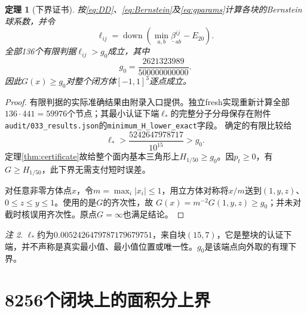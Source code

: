 \documentclass[UTF8,11pt,a4paper,fontset=fandol]{ctexart}
\newtheorem{theorem}{定理}[section]
\theoremstyle{definition}\newtheorem{definition}[theorem]{定义}
\theoremstyle{remark}\newtheorem{remark}[theorem]{注}
\newcommand{\abs}[1]{\left|#1\right|}
\newcommand{\src}[1]{\nolinkurl{#1}}
\begin{document}
\begin{theorem}[下界证书]\label{thm:g}
按\eqref{eq:DD}、\eqref{eq:Bernstein}及\eqref{eq:gparams}计算各块的Bernstein球系数，并令
\[
 \ell_{ij}=\operatorname{down}\!\left(
  \min_{a,b}\underline\beta^{ij}_{ab}-E_{20}\right).
\]
全部136个有限判据$\ell_{ij}>g_0$成立，其中
\begin{equation}\label{eq:g0}
 g_0=\frac{2621323989}{500000000000}.
\end{equation}
因此$G(x)\ge g_0$对整个闭方体$[-1,1]^3$逐点成立。
\end{theorem}
\begin{proof}
有限判据的实际准确结果由附录入口提供。独立fresh实现重新计算全部$136\cdot441=59976$个节点；其最小认证下端$\ell_*$的完整分子分母保存在附件
\src{audit/033_results.json}的\src{minimum_H_lower_exact}字段。
确定的有限比较给
\[
 \ell_*>\frac{5242647978717}{10^{15}}>g_0.
\]
定理\ref{thm:certificate}故给整个面内基本三角形上$H_{1/50}\ge g_0$。因$p_t\ge0$，有$G\ge H_{1/50}$，此下界无需支付短时误差。

对任意非零方体点$x$，令$m=\max_i\abs{x_i}\le1$，用立方体对称将$x/m$送到$(1,y,z)$、$0\le z\le y\le1$。使用的是$G$的齐次性，故
$G(x)=m^{-2}G(1,y,z)\ge g_0$；并未对截时核误用齐次性。原点$G=\infty$也满足结论。
\end{proof}

\begin{remark}
$\ell_*$约为$0.0052426479787179679751$，来自块$(15,7)$，它是整块的认证下端，并不声称是真实最小值、最小值位置或唯一性。$g_0$是该端点向外取的有理下界。
\end{remark}

\section{8256个闭块上的面积分上界}
\end{document}
